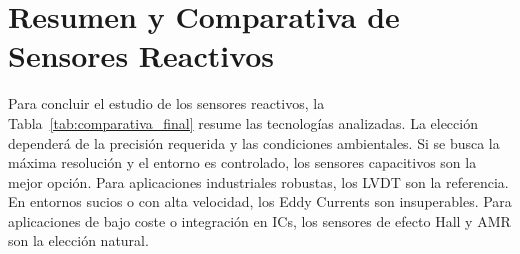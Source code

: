 
\begin{marginfigure}[-2em]
    \centering
    \shorthandoff{>}
    \caption[Diagrama de bloques de un demodulador síncrono.]{Diagrama de bloques de un demodulador síncrono. Esta estructura actúa como un filtro de banda estrecha extremadamente selectivo, eliminando cualquier ruido que no esté en fase con la referencia.}\label{fig:block_demod}
\end{marginfigure}

\section{Resumen y Comparativa de Sensores Reactivos}\label{sec:resumen_reactivos}

Para concluir el estudio de los sensores reactivos, la Tabla~\ref{tab:comparativa_final} resume las tecnologías analizadas. La elección dependerá de la precisión requerida y las condiciones ambientales. 
  Si se busca la máxima resolución y el entorno es controlado, los sensores capacitivos son la mejor opción. Para aplicaciones industriales robustas, los LVDT son la referencia. En entornos sucios o con alta velocidad, los Eddy Currents son insuperables. Para aplicaciones de bajo coste o integración en ICs, los sensores de efecto Hall y AMR son la elección natural.

